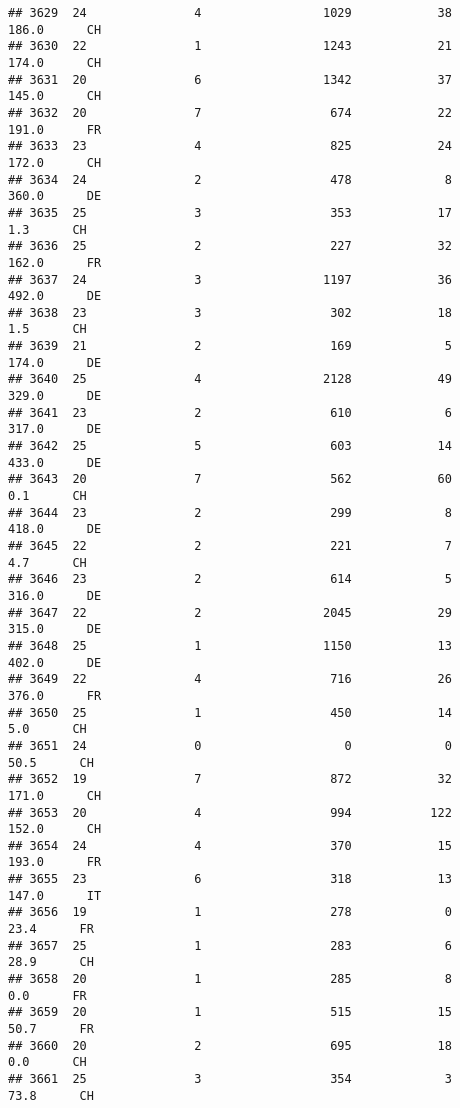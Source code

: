 \documentclass[
]{article}
\begin{document}
\begin{verbatim}
## 3629  24               4                 1029            38    186.0      CH
## 3630  22               1                 1243            21    174.0      CH
## 3631  20               6                 1342            37    145.0      CH
## 3632  20               7                  674            22    191.0      FR
## 3633  23               4                  825            24    172.0      CH
## 3634  24               2                  478             8    360.0      DE
## 3635  25               3                  353            17      1.3      CH
## 3636  25               2                  227            32    162.0      FR
## 3637  24               3                 1197            36    492.0      DE
## 3638  23               3                  302            18      1.5      CH
## 3639  21               2                  169             5    174.0      DE
## 3640  25               4                 2128            49    329.0      DE
## 3641  23               2                  610             6    317.0      DE
## 3642  25               5                  603            14    433.0      DE
## 3643  20               7                  562            60      0.1      CH
## 3644  23               2                  299             8    418.0      DE
## 3645  22               2                  221             7      4.7      CH
## 3646  23               2                  614             5    316.0      DE
## 3647  22               2                 2045            29    315.0      DE
## 3648  25               1                 1150            13    402.0      DE
## 3649  22               4                  716            26    376.0      FR
## 3650  25               1                  450            14      5.0      CH
## 3651  24               0                    0             0     50.5      CH
## 3652  19               7                  872            32    171.0      CH
## 3653  20               4                  994           122    152.0      CH
## 3654  24               4                  370            15    193.0      FR
## 3655  23               6                  318            13    147.0      IT
## 3656  19               1                  278             0     23.4      FR
## 3657  25               1                  283             6     28.9      CH
## 3658  20               1                  285             8      0.0      FR
## 3659  20               1                  515            15     50.7      FR
## 3660  20               2                  695            18      0.0      CH
## 3661  25               3                  354             3     73.8      CH

\end{verbatim}
\end{document}
